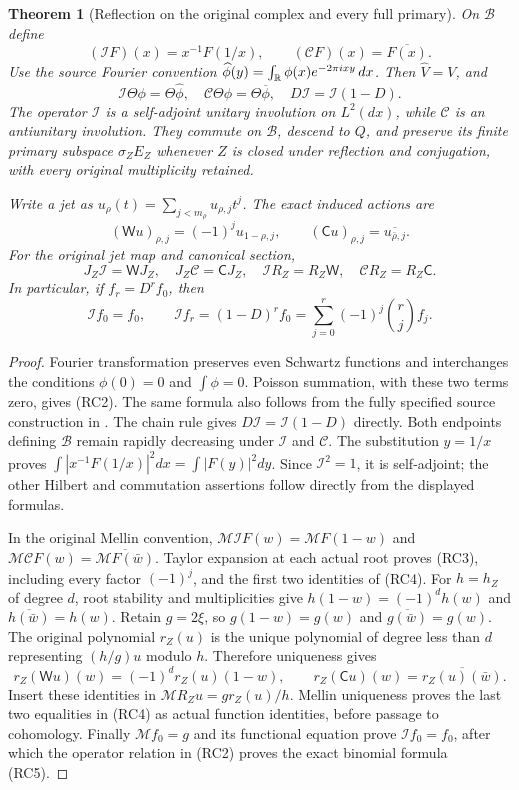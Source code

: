 \documentclass[11pt]{article}
\newtheorem{theorem}{Theorem}[section]
\newcommand{\B}{\mathscr B}\newcommand{\M}{\mathcal M}
\begin{document}
\begin{theorem}[Reflection on the original complex and every full primary]
On $\B$ define
\[
 (\mathcal IF)(x)=x^{-1}F(1/x),\qquad (\mathcal CF)(x)=\overline{F(x)}.
 \tag{RC1}
\]
Use the source Fourier convention
$\widehat\phi(y)=\int_\mathbb R\phi(x)e^{-2\pi ixy}\,dx$.
Then $\widehat V=V$, and
\[
 \mathcal I\Theta\phi=\Theta\widehat\phi,
 \quad\mathcal C\Theta\phi=\Theta\overline\phi,
 \quad D\mathcal I=\mathcal I(1-D).
 \tag{RC2}
\]
The operator $\mathcal I$ is a self-adjoint unitary involution on
$L^2(dx)$, while $\mathcal C$ is an antiunitary involution. They
commute on $\B$, descend to $Q$, and preserve its finite primary
subspace $\sigma_ZE_Z$ whenever $Z$ is closed under reflection and
conjugation, with every original multiplicity retained.

Write a jet as $u_\rho(t)=\sum_{j<m_\rho}u_{\rho,j}t^j$.
The exact induced actions are
\[
 (\mathsf Wu)_{\rho,j}=(-1)^j u_{1-\rho,j},\qquad
 (\mathsf Cu)_{\rho,j}=\overline{u_{\bar\rho,j}}.
 \tag{RC3}
\]
For the original jet map and canonical section,
\[
 J_Z\mathcal I=\mathsf WJ_Z,\quad J_Z\mathcal C=\mathsf CJ_Z,
 \quad \mathcal IR_Z=R_Z\mathsf W,\quad
 \mathcal CR_Z=R_Z\mathsf C.
 \tag{RC4}
\]
In particular, if $f_r=D^rf_0$, then
\[
 \mathcal If_0=f_0,\qquad
 \mathcal If_r=(1-D)^rf_0
 =\sum_{j=0}^r(-1)^j\binom rj f_j.
 \tag{RC5}
\]
\end{theorem}
\begin{proof}
Fourier transformation preserves even Schwartz functions and
interchanges the conditions $\phi(0)=0$ and $\int\phi=0$.
Poisson summation, with these two terms zero, gives (RC2).
The same formula also follows from the fully specified source
construction in \cite[Lemma 4.1]{CCcycles}. The chain rule gives
$D\mathcal I=\mathcal I(1-D)$ directly. Both endpoints defining
$\B$ remain rapidly decreasing under $\mathcal I$ and $\mathcal C$.
The substitution $y=1/x$ proves
$\int|x^{-1}F(1/x)|^2dx=\int|F(y)|^2dy$.
Since $\mathcal I^2=1$, it is self-adjoint; the other Hilbert and
commutation assertions follow directly from the displayed formulas.

In the original Mellin convention,
$\M\mathcal IF(w)=\M F(1-w)$ and
$\M\mathcal CF(w)=\overline{\M F(\bar w)}$.
Taylor expansion at each actual root proves (RC3), including every
factor $(-1)^j$, and the first two identities of (RC4).
For $h=h_Z$ of degree $d$, root stability and multiplicities give
$h(1-w)=(-1)^dh(w)$ and $\overline{h(\bar w)}=h(w)$.
Retain $g=2\xi$, so $g(1-w)=g(w)$ and
$\overline{g(\bar w)}=g(w)$. The original polynomial
$r_Z(u)$ is the unique polynomial of degree less than $d$ representing
$(h/g)u$ modulo $h$. Therefore uniqueness gives
\[
 r_Z(\mathsf Wu)(w)=(-1)^d r_Z(u)(1-w),\qquad
 r_Z(\mathsf Cu)(w)=\overline{r_Z(u)(\bar w)}.
\]
Insert these identities in $\M R_Zu=g r_Z(u)/h$.
Mellin uniqueness proves the last two equalities in (RC4)
as actual function identities, before passage to cohomology.
Finally $\M f_0=g$ and its functional equation prove
$\mathcal If_0=f_0$, after which the operator relation in (RC2)
proves the exact binomial formula (RC5).
\end{proof}
\end{document}
